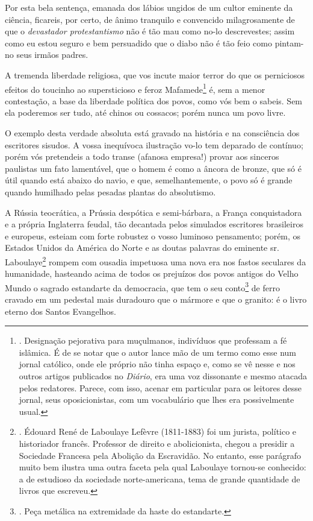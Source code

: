 Por esta bela sentença, emanada dos lábios ungidos de um cultor eminente
da ciência, ficareis, por certo, de ânimo tranquilo e convencido
milagrosamente de que o \emph{devastador protestantismo} não é tão mau
como no-lo descrevestes; assim como eu estou seguro e bem persuadido que
o diabo não é tão feio como pintam-no seus irmãos padres.

A tremenda liberdade religiosa, que vos incute maior terror do que os
perniciosos efeitos do toucinho ao supersticioso e feroz
Mafamede\footnote{. Designação pejorativa para muçulmanos, indivíduos
  que professam a fé islâmica. É de se notar que o autor lance mão de um
  termo como esse num jornal católico, onde ele próprio não tinha espaço
  e, como se vê nesse e nos outros artigos publicados no \emph{Diário},
  era uma voz dissonante e mesmo atacada pelos redatores. Parece, com
  isso, acenar em particular para os leitores desse jornal, seus
  oposicionistas, com um vocabulário que lhes era possivelmente usual.}
é, sem a menor contestação, a base da liberdade política dos povos, como
vós bem o sabeis. Sem ela poderemos ser tudo, até chinos ou cossacos;
porém nunca um povo livre.

O exemplo desta verdade absoluta está gravado na história e na
consciência dos escritores sisudos. A vossa inequívoca ilustração vo-lo
tem deparado de contínuo; porém vós pretendeis a todo transe (afanosa
empresa!) provar aos sinceros paulistas um fato lamentável, que o homem
é como a âncora de bronze, que só é útil quando está abaixo do navio, e
que, semelhantemente, o povo só é grande quando humilhado pelas pesadas
plantas do absolutismo.

A Rússia teocrática, a Prússia despótica e semi-bárbara, a França
conquistadora e a própria Inglaterra feudal, tão decantada pelos
simulados escritores brasileiros e europeus, esteiam com forte robustez
o vosso luminoso pensamento; porém, os Estados Unidos da América do
Norte e as doutas palavras do eminente sr. Laboulaye\footnote{. Édouard
  René de Laboulaye Lefèvre (1811-1883) foi um jurista, político e
  historiador francês. Professor de direito e abolicionista, chegou a
  presidir a Sociedade Francesa pela Abolição da Escravidão. No entanto,
  esse parágrafo muito bem ilustra uma outra faceta pela qual Laboulaye
  tornou-se conhecido: a de estudioso da sociedade norte-americana, tema
  de grande quantidade de livros que escreveu.} rompem com ousadia
impetuosa uma nova era nos fastos seculares da humanidade, hasteando
acima de todos os prejuízos dos povos antigos do Velho Mundo o sagrado
estandarte da democracia, que tem o seu conto\footnote{. Peça metálica
  na extremidade da haste do estandarte.} de ferro cravado em um
pedestal mais duradouro que o mármore e que o granito: é o livro eterno
dos Santos Evangelhos.

